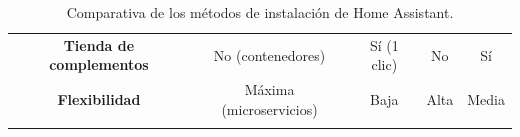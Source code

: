 \begin{table}[H]
\begin{tabular}{|c|c|c|c|c|}
        \parbox[c]{4.5cm}{\vspace{0.2cm}\centering\textbf{Tienda de complementos}\vspace{0.2cm}} & \parbox[c]{2.4cm}{\vspace{0.2cm}\centering No (contenedores)\vspace{0.2cm}} & \parbox[c]{1.9cm}{\vspace{0.2cm}\centering Sí (1 clic)\vspace{0.2cm}} & \parbox[c]{2.4cm}{\vspace{0.2cm}\centering No\vspace{0.2cm}} & \parbox[c]{2.2cm}{\vspace{0.2cm}\centering Sí\vspace{0.2cm}} \\ \hhline{|-|-|-|-|-|}
        \parbox[c]{4.5cm}{\vspace{0.2cm}\centering\textbf{Flexibilidad}\vspace{0.2cm}} & \parbox[c]{2.4cm}{\vspace{0.2cm}\centering Máxima (microservicios)\vspace{0.2cm}} & \parbox[c]{1.9cm}{\vspace{0.2cm}\centering Baja\vspace{0.2cm}} & \parbox[c]{2.4cm}{\vspace{0.2cm}\centering Alta\vspace{0.2cm}} & \parbox[c]{2.2cm}{\vspace{0.2cm}\centering Media\vspace{0.2cm}} \\ \hhline{|-|-|-|-|-|}
    \end{tabular}
    \caption{Comparativa de los métodos de instalación de Home Assistant.}
    \label{tab:ha_instalacion}
\end{table}

